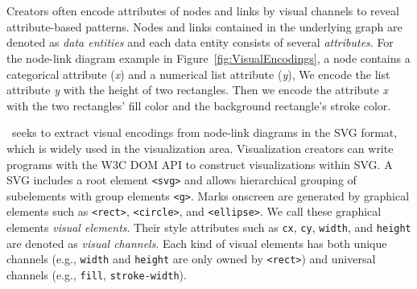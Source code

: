 \section{\ApproachName}


Creators often encode attributes of nodes and links by visual channels to reveal attribute-based patterns.
Nodes and links contained in the underlying graph are denoted as \textit{data entities} and each data entity consists of several \textit{attributes}.
For the node-link diagram example in Figure~\ref{fig:VisualEncodings}, a node contains a categorical attribute (\textit{x}) and a numerical list attribute (\textit{y}), We encode the list attribute \textit{y} with the height of two rectangles.
Then we encode the attribute \textit{x} with the two rectangles' fill color and the background rectangle's stroke color.

\ApproachName~seeks to extract visual encodings from node-link diagrams in the SVG format, which is widely used in the visualization area.
Visualization creators can write programs with the W3C DOM API to construct visualizations within SVG.
A SVG includes a root element \texttt{<svg>} and allows hierarchical grouping of subelements with group elements \texttt{<g>}.
Marks onscreen are generated by graphical elements such as \texttt{<rect>}, \texttt{<circle>}, and \texttt{<ellipse>}.
We call these graphical elements \textit{visual elements}.
Their style attributes such as \texttt{cx}, \texttt{cy}, \texttt{width}, and \texttt{height} are denoted as \textit{visual channels}.
Each kind of visual elements has both unique channels (e.g., \texttt{width} and \texttt{height} are only owned by \texttt{<rect>}) and universal channels (e.g., \texttt{fill}, \texttt{stroke-width}).

